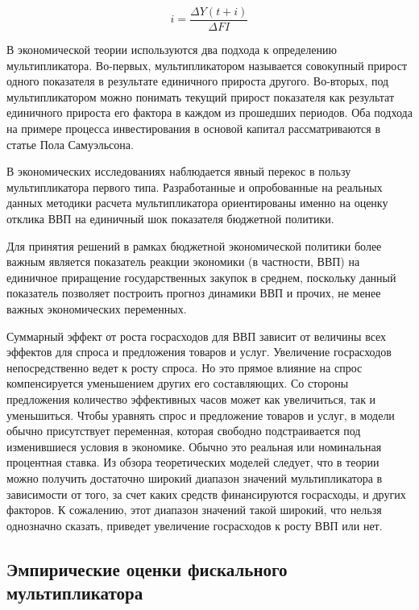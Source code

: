 \documentclass[12pt, a4paper]{extarticle}
\begin{document}
\begin{equation}
    i = \frac{\Delta Y(t + i)}{\Delta FI}
\end{equation}


\par
    В экономической теории используются два подхода к определению мультипликатора. Во-первых, мультипликатором называется совокупный прирост одного показателя в результате единичного прироста другого. Во-вторых, под мультипликатором можно понимать текущий прирост показателя как результат единичного прироста его фактора в каждом из прошедших периодов. Оба подхода на примере процесса инвестирования в основой капитал рассматриваются в статье Пола Самуэльсона.\cite{samuelson}

\par
    В экономических исследованиях наблюдается явный перекос в пользу мультипликатора первого типа. Разработанные и опробованные на реальных данных методики расчета мультипликатора ориентированы именно на оценку отклика ВВП на единичный шок показателя бюджетной политики. 

\par
    Для принятия решений в рамках бюджетной экономической политики более важным является показатель реакции экономики (в частности, ВВП) на единичное приращение государственных закупок в среднем, поскольку данный показатель позволяет построить прогноз динамики ВВП и прочих, не менее важных экономических переменных.

\par
    Суммарный эффект от роста госрасходов для ВВП зависит от величины всех эффектов для спроса и предложения товаров и услуг. Увеличение госрасходов непосредственно ведет к росту спроса. Но это прямое влияние на спрос компенсируется уменьшением других его составляющих. Со стороны предложения количество эффективных часов может как увеличиться, так и уменьшиться. Чтобы уравнять спрос и предложение товаров и услуг, в модели обычно присутствует переменная, которая свободно подстраивается под изменившиеся условия в экономике. Обычно это реальная или номинальная процентная ставка. Из обзора теоретических моделей \cite{ramey} следует, что в теории можно получить достаточно широкий диапазон значений мультипликатора в зависимости от того, за счет каких средств финансируются госрасходы, и других факторов. К сожалению, этот диапазон значений такой широкий, что нельзя однозначно сказать, приведет увеличение госрасходов к росту ВВП или нет.
    
\subsection{Эмпирические оценки фискального мультипликатора}
\end{document}
